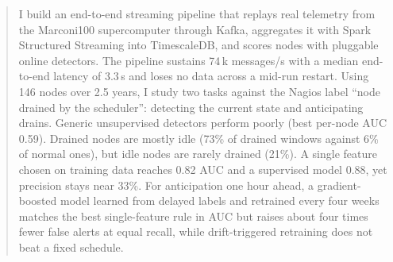 \begin{abstract}
I build an end-to-end streaming pipeline that replays real telemetry from the Marconi100 supercomputer through Kafka, aggregates it with Spark Structured Streaming into TimescaleDB, and scores nodes with pluggable online detectors. The pipeline sustains 74\,k messages/s with a median end-to-end latency of 3.3\,s and loses no data across a mid-run restart. Using 146 nodes over 2.5 years, I study two tasks against the Nagios label ``node drained by the scheduler'': detecting the current state and anticipating drains. Generic unsupervised detectors perform poorly (best per-node AUC 0.59). Drained nodes are mostly idle (73\% of drained windows against 6\% of normal ones), but idle nodes are rarely drained (21\%). A single feature chosen on training data reaches 0.82 AUC and a supervised model 0.88, yet precision stays near 33\%. For anticipation one hour ahead, a gradient-boosted model learned from delayed labels and retrained every four weeks matches the best single-feature rule in AUC but raises about four times fewer false alerts at equal recall, while drift-triggered retraining does not beat a fixed schedule.
\end{abstract}
